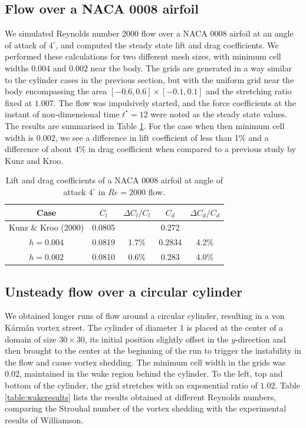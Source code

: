 \documentclass{tufte-handout}
\begin{document}
\subsection{Flow over a NACA 0008 airfoil}

We simulated Reynolds number 2000 flow over a NACA 0008 airfoil at an angle of attack of $4^\circ$, and computed the steady state lift and drag coefficients. We performed these calculations for two different mesh sizes, with minimum cell widths $0.004$ and $0.002$ near the body. The grids are generated in a way similar to the cylinder cases in the previous section, but with the uniform grid near the body encompassing the area $[-0.6,0.6]\times[-0.1,0.1]$ and the stretching ratio fixed at $1.007$. The flow was impulsively started, and the force coefficients at the instant of non-dimensional time $t^*=12$ were noted as the steady state values. The results are summarised in Table \ref{table:naca0008}. For the case when then minimum cell width is $0.002$, we see a difference in lift coefficient of less than 1\% and a difference of about 4\% in drag coefficient when compared to a previous study by Kunz and Kroo.\cite{Kunz2000}

\begin{table}[t]
  \centering
  \selectfont
    \begin{tabular}{ c c c c c }
	\toprule
	Case & $C_l$ & $\Delta{C_l}/C_l$ & $C_d$ & $\Delta{C_d}/C_d$\\
	\midrule
	Kunz \& Kroo (2000) & 0.0805 & & 0.272 & \\	
	$h=0.004$ & 0.0819 & 1.7\% & 0.2834 & 4.2\% \\	
	$h=0.002$ & 0.0810 & 0.6\% & 0.283 & 4.0\% \\
	\bottomrule
    \end{tabular}
    \caption{Lift and drag coefficients of a NACA 0008 airfoil at angle of attack $4^\circ$ in $Re=2000$ flow.}\vspace{0.25cm}
    \label{table:naca0008}
\end{table}

\subsection{Unsteady flow over a circular cylinder}

We obtained longer runs of flow around a circular cylinder, resulting in a von K{\'a}rm{\'a}n vortex street. 
The cylinder of diameter $1$ is placed at the center of a domain of size $30\times 30$, its initial position slightly offset in the $y$-direction and then brought to the center at the beginning of the run to trigger the instability in the flow and cause vortex shedding. The minimum cell width in the grids was $0.02$, maintained in the wake region behind the cylinder. To the left, top and bottom of the cylinder, the grid stretches with an exponential ratio of $1.02$. 
Table \ref{table:wakeresults} lists the results obtained at different Reynolds numbers, comparing the Strouhal number of the vortex shedding with the experimental results of Williamson.\cite{Williamson1996}
\end{document}
